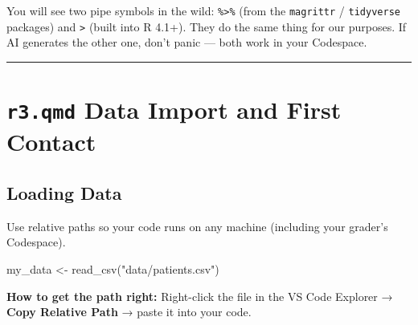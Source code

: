 \documentclass[
  letterpaper,
  DIV=11,
  numbers=noendperiod,
  oneside]{scrreprt}
\newenvironment{Shaded}{\begin{snugshade}}{\end{snugshade}}
\newcommand{\FunctionTok}[1]{\textcolor[rgb]{0.28,0.35,0.67}{#1}}
\newcommand{\NormalTok}[1]{\textcolor[rgb]{0.00,0.23,0.31}{#1}}
\newcommand{\OtherTok}[1]{\textcolor[rgb]{0.00,0.23,0.31}{#1}}
\newcommand{\StringTok}[1]{\textcolor[rgb]{0.13,0.47,0.30}{#1}}
\begin{document}
\begin{tcolorbox}[enhanced jigsaw, opacitybacktitle=0.6, colbacktitle=quarto-callout-tip-color!10!white, breakable, opacityback=0, coltitle=black, toptitle=1mm, bottomrule=.15mm, colframe=quarto-callout-tip-color-frame, bottomtitle=1mm, colback=white, leftrule=.75mm, rightrule=.15mm, title=\textcolor{quarto-callout-tip-color}{\faLightbulb}\hspace{0.5em}{Tip}, left=2mm, arc=.35mm, toprule=.15mm, titlerule=0mm]

You will see two pipe symbols in the wild: \texttt{\%\textgreater{}\%}
(from the \texttt{magrittr} / \texttt{tidyverse} packages) and
\texttt{\textbar{}\textgreater{}} (built into R 4.1+). They do the same
thing for our purposes. If AI generates the other one, don't panic ---
both work in your Codespace.

\end{tcolorbox}

\begin{center}\rule{0.5\linewidth}{0.5pt}\end{center}

\section*{\texorpdfstring{\texttt{r3.qmd} Data Import and First
Contact}{r3.qmd Data Import and First Contact}}\label{r3.qmd-data-import-and-first-contact}


\subsection*{Loading Data}\label{loading-data}

Use relative paths so your code runs on any machine (including your
grader's Codespace).

\begin{Shaded}
\begin{Highlighting}[numbers=left,,]
\NormalTok{my\_data }\OtherTok{\textless{}{-}} \FunctionTok{read\_csv}\NormalTok{(}\StringTok{"data/patients.csv"}\NormalTok{)}
\end{Highlighting}
\end{Shaded}

\textbf{How to get the path right:} Right-click the file in the VS Code
Explorer → \textbf{Copy Relative Path} → paste it into your code.
\end{document}
